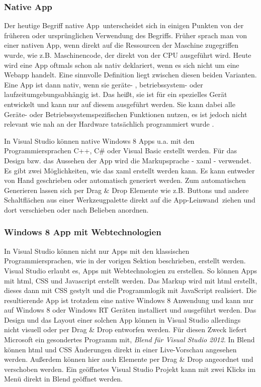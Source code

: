 \documentclass[12pt,a4paper,bibtotoc,abstracton]{scrartcl}
\begin{document}
\subsubsection{Native App}
\label{subsubsec:nativ}
Der heutige Begriff \glqq native App\grqq\ unterscheidet sich in einigen Punkten von der früheren oder ursprünglichen Verwendung des Begriffs. Früher sprach man von einer nativen App, wenn direkt auf die Ressourcen der  Maschine zugegriffen wurde, wie z.B. Maschinencode, der direkt von der CPU ausgeführt wird. Heute wird eine App oftmals schon als nativ deklariert, wenn es sich nicht um eine Webapp handelt. Eine sinnvolle Definition liegt zwischen diesen beiden Varianten. Eine App ist dann nativ, wenn sie geräte- , betriebssystem- oder laufzeitumgebungsabhängig ist. Das heißt, sie ist für ein spezielles Gerät entwickelt und kann nur auf diesem ausgeführt werden. Sie kann dabei alle Geräte- oder Betriebssystemspezifischen Funktionen nutzen, es ist jedoch nicht relevant wie nah an der Hardware tatsächlich programmiert wurde \citep{OBrian2013}.

In Visual Studio können native Windows 8  Apps u.a. mit den Programmiersprachen C++, C\# oder Visual Basic erstellt werden. Für das Design bzw. das Aussehen der App wird die Markupsprache - \ac{xaml} - verwendet. Es gibt zwei Möglichkeiten, wie das \ac{xaml} erstellt werden kann. Es kann entweder von Hand geschrieben oder automatisch generiert werden. Zum automatischen Generieren lassen sich per Drag \& Drop Elemente wie z.B. Buttons und andere Schaltflächen aus einer Werkzeugpalette direkt auf die \glqq App-Leinwand\grqq\ ziehen und dort verschieben oder nach Belieben anordnen.

\subsubsection{Windows 8 App mit Webtechnologien}
\label{subsubsec:webwin8}
In Visual Studio können nicht nur Apps mit den klassischen Programmiersprachen, wie in der vorigen Sektion beschrieben, erstellt werden. Visual Studio erlaubt es, Apps mit Webtechnologien zu erstellen. So können Apps mit \ac{html}, CSS und Javascript erstellt werden. Das Markup wird mit \ac{html} erstellt, dieses dann mit CSS gestylt und die Programmlogik mit JavaScript realisiert. Die resultierende App ist trotzdem eine native Windows 8 Anwendung und kann nur auf Windows 8 oder Windows RT Geräten installiert und ausgeführt werden. Das Design und das Layout einer solchen App können in Visual Studio allerdings nicht visuell oder per Drag \& Drop entworfen werden. Für diesen Zweck liefert Microsoft ein gesondertes Programm mit, \textit{Blend für Visual Studio 2012}. In Blend können \ac{html} und CSS Änderungen direkt in einer Live-Vorschau angesehen werden. Außerdem können hier auch Elemente per Drag \& Drop angeordnet und verschoben werden. Ein geöffnetes Visual Studio Projekt kann mit zwei Klicks im Menü direkt in Blend geöffnet werden. 
\end{document}
